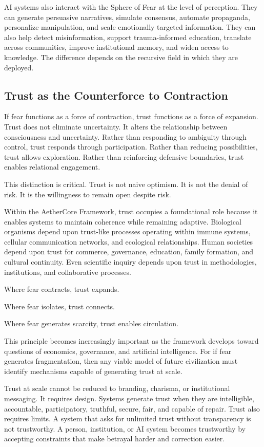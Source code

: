 \documentclass[12pt]{article}
\begin{document}
AI systems also interact with the Sphere of Fear at the level of perception. They can generate persuasive narratives, simulate consensus, automate propaganda, personalize manipulation, and scale emotionally targeted information. They can also help detect misinformation, support trauma-informed education, translate across communities, improve institutional memory, and widen access to knowledge. The difference depends on the recursive field in which they are deployed.

\subsection{Trust as the Counterforce to Contraction}

If fear functions as a force of contraction, trust functions as a force of expansion. Trust does not eliminate uncertainty. It alters the relationship between consciousness and uncertainty. Rather than responding to ambiguity through control, trust responds through participation. Rather than reducing possibilities, trust allows exploration. Rather than reinforcing defensive boundaries, trust enables relational engagement.

This distinction is critical. Trust is not naive optimism. It is not the denial of risk. It is the willingness to remain open despite risk.

Within the AetherCore Framework, trust occupies a foundational role because it enables systems to maintain coherence while remaining adaptive. Biological organisms depend upon trust-like processes operating within immune systems, cellular communication networks, and ecological relationships. Human societies depend upon trust for commerce, governance, education, family formation, and cultural continuity. Even scientific inquiry depends upon trust in methodologies, institutions, and collaborative processes.

Where fear contracts, trust expands.

Where fear isolates, trust connects.

Where fear generates scarcity, trust enables circulation.

This principle becomes increasingly important as the framework develops toward questions of economics, governance, and artificial intelligence. For if fear generates fragmentation, then any viable model of future civilization must identify mechanisms capable of generating trust at scale.

Trust at scale cannot be reduced to branding, charisma, or institutional messaging. It requires design. Systems generate trust when they are intelligible, accountable, participatory, truthful, secure, fair, and capable of repair. Trust also requires limits. A system that asks for unlimited trust without transparency is not trustworthy. A person, institution, or AI system becomes trustworthy by accepting constraints that make betrayal harder and correction easier.
\end{document}
